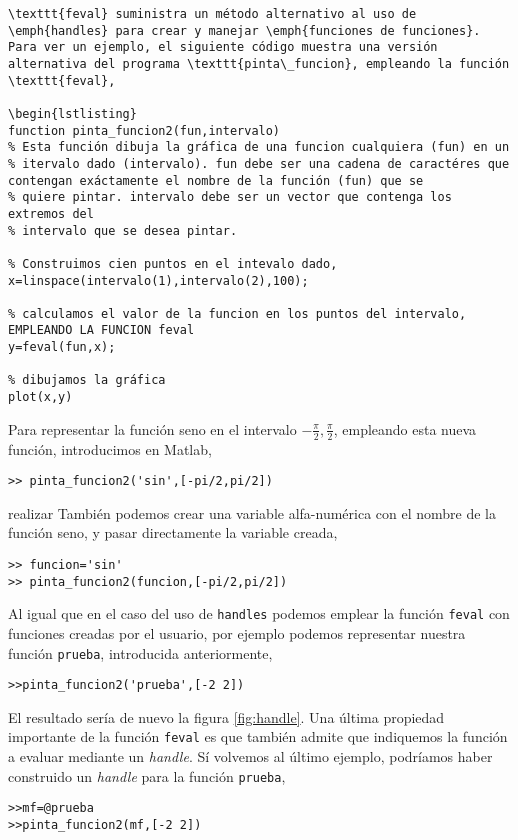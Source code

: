\begin{lstlisting}
\texttt{feval} suministra un método alternativo al uso de \emph{handles} para crear y manejar \emph{funciones de funciones}. Para ver un ejemplo, el siguiente código muestra una versión alternativa del programa \texttt{pinta\_funcion}, empleando la función \texttt{feval},

\begin{lstlisting}
function pinta_funcion2(fun,intervalo)
% Esta función dibuja la gráfica de una funcion cualquiera (fun) en un
% itervalo dado (intervalo). fun debe ser una cadena de caractéres que contengan exáctamente el nombre de la función (fun) que se 
% quiere pintar. intervalo debe ser un vector que contenga los extremos del
% intervalo que se desea pintar.

% Construimos cien puntos en el intevalo dado,
x=linspace(intervalo(1),intervalo(2),100);

% calculamos el valor de la funcion en los puntos del intervalo, EMPLEANDO LA FUNCION feval
y=feval(fun,x);

% dibujamos la gráfica
plot(x,y)
\end{lstlisting}

Para representar la función seno en el intervalo $-\frac{\pi}{2}, \frac{\pi}{2}$, empleando esta nueva función, introducimos en Matlab,

\begin{verbatim}
>> pinta_funcion2('sin',[-pi/2,pi/2])
\end{verbatim}
 realizar 
También podemos crear una variable alfa-numérica con el nombre de la función seno, y pasar directamente la variable creada,

\begin{verbatim}
>> funcion='sin'
>> pinta_funcion2(funcion,[-pi/2,pi/2])
\end{verbatim}

Al igual que en el caso del uso de \texttt{handles} podemos emplear la función \texttt{feval} con funciones creadas por el usuario, por ejemplo podemos representar nuestra función \texttt{prueba}, introducida anteriormente, 

\begin{verbatim}
>>pinta_funcion2('prueba',[-2 2])
\end{verbatim}

El resultado sería de nuevo la figura \ref{fig:handle}.  Una última propiedad importante de la función \texttt{feval} es que también admite que indiquemos la función a evaluar mediante un \emph{handle}. Sí volvemos al último ejemplo, podríamos haber construido un \emph{handle} para la función \texttt{prueba},
\begin{verbatim}
>>mf=@prueba
>>pinta_funcion2(mf,[-2 2])
\end{verbatim} 

